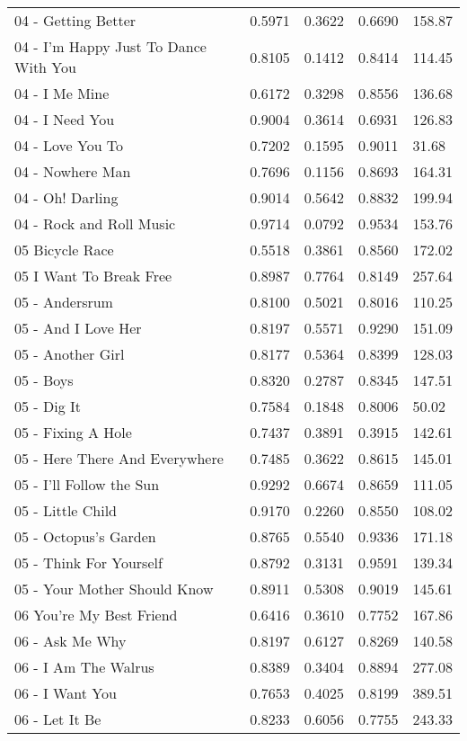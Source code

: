 \begin{longtable}[c]{|p{8cm}|c|l|l|l|}
04 - Getting Better & 0.5971 & 0.3622 & 0.6690 & 158.87 \\
04 - I'm Happy Just To Dance With You & 0.8105 & 0.1412 & 0.8414 & 114.45 \\
04 - I Me Mine & 0.6172 & 0.3298 & 0.8556 & 136.68 \\
04 - I Need You & 0.9004 & 0.3614 & 0.6931 & 126.83 \\
04 - Love You To & 0.7202 & 0.1595 & 0.9011 & 31.68 \\
04 - Nowhere Man & 0.7696 & 0.1156 & 0.8693 & 164.31 \\
04 - Oh! Darling & 0.9014 & 0.5642 & 0.8832 & 199.94 \\
04 - Rock and Roll Music & 0.9714 & 0.0792 & 0.9534 & 153.76 \\
05 Bicycle Race & 0.5518 & 0.3861 & 0.8560 & 172.02 \\
05 I Want To Break Free & 0.8987 & 0.7764 & 0.8149 & 257.64 \\
05 - Andersrum & 0.8100 & 0.5021 & 0.8016 & 110.25 \\
05 - And I Love Her & 0.8197 & 0.5571 & 0.9290 & 151.09 \\
05 - Another Girl & 0.8177 & 0.5364 & 0.8399 & 128.03 \\
05 - Boys & 0.8320 & 0.2787 & 0.8345 & 147.51 \\
05 - Dig It & 0.7584 & 0.1848 & 0.8006 & 50.02 \\
05 - Fixing A Hole & 0.7437 & 0.3891 & 0.3915 & 142.61 \\
05 - Here  There And Everywhere & 0.7485 & 0.3622 & 0.8615 & 145.01 \\
05 - I'll Follow the Sun & 0.9292 & 0.6674 & 0.8659 & 111.05 \\
05 - Little Child & 0.9170 & 0.2260 & 0.8550 & 108.02 \\
05 - Octopus's Garden & 0.8765 & 0.5540 & 0.9336 & 171.18 \\
05 - Think For Yourself & 0.8792 & 0.3131 & 0.9591 & 139.34 \\
05 - Your Mother Should Know & 0.8911 & 0.5308 & 0.9019 & 145.61 \\
06 You're My Best Friend & 0.6416 & 0.3610 & 0.7752 & 167.86 \\
06 - Ask Me Why & 0.8197 & 0.6127 & 0.8269 & 140.58 \\
06 - I Am The Walrus & 0.8389 & 0.3404 & 0.8894 & 277.08 \\
06 - I Want You & 0.7653 & 0.4025 & 0.8199 & 389.51 \\
06 - Let It Be & 0.8233 & 0.6056 & 0.7755 & 243.33 \\

\end{longtable}

